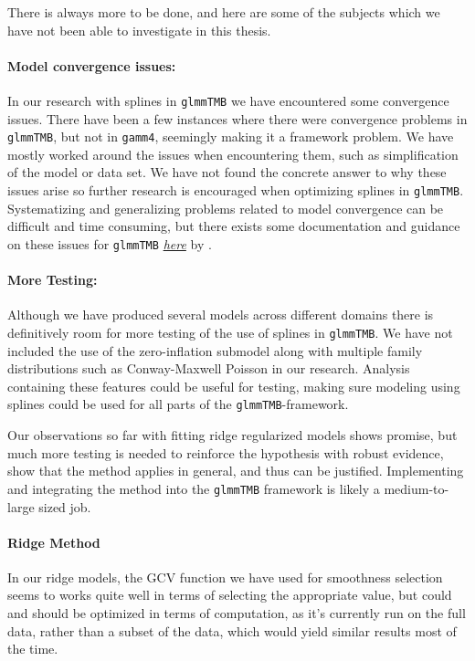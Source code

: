\documentclass[12pt, twoside,hidelinks]{article}
\theoremstyle{definition}
\numberwithin{equation}{section}
\begin{document}
There is always more to be done, and here are some of the subjects which we have not been able to investigate in this thesis.

\paragraph{Model convergence issues:} 

In our research with splines in \texttt{glmmTMB} we have encountered some convergence issues. There have been a few instances where there were convergence problems in \texttt{glmmTMB}, but not in \texttt{gamm4}, seemingly making it a framework problem. We have mostly worked around the issues when encountering them, such as simplification of the model or data set. We have not found the concrete answer to why these issues arise so further research is encouraged when optimizing splines in \texttt{glmmTMB}. Systematizing and generalizing problems related to model convergence can be difficult and time consuming, but there exists some documentation and guidance on these issues for \texttt{glmmTMB} \href{https://cran.r-project.org/web/packages/glmmTMB/vignettes/troubleshooting.html}{\textit{here}} by \citet{glmmTMBtroubleshooting}.


\paragraph{More Testing:}

Although we have produced several models across different domains there is definitively room for more testing of the use of splines in \texttt{glmmTMB}. We have not included the use of the zero-inflation submodel along with multiple family distributions such as Conway-Maxwell Poisson in our research. Analysis containing these features could be useful for testing, making sure modeling using splines could be used for all parts of the \texttt{glmmTMB}-framework.
\newline

Our observations so far with fitting ridge regularized models shows promise, but much more testing is needed to reinforce the hypothesis with robust evidence, show that the method applies in general, and thus can be justified. Implementing and integrating the method into the \texttt{glmmTMB} framework is likely a medium-to-large sized job. 
\newline

\paragraph{Ridge Method}
In our ridge models, the GCV function we have used for smoothness selection seems to works quite well in terms of selecting the appropriate value, but could and should be optimized in terms of computation, as it's currently run on the full data, rather than a subset of the data, which would yield similar results most of the time.
\newline
\end{document}
